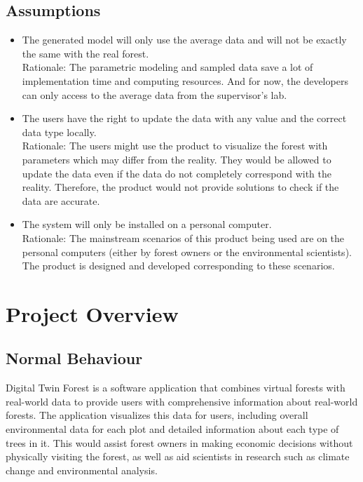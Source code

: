 \documentclass[12pt, titlepage]{article}
\begin{document}
\subsection{Assumptions}
\begin{itemize}
    \item The generated model will only use the average data and will not be exactly the same with the real forest.\\
    Rationale: The parametric modeling and sampled data save a lot of implementation time and computing resources. And for now, the developers can only access to the average data from the supervisor's lab. 
    \item The users have the right to update the data with any value and the correct data type locally. \\
    Rationale: The users might use the product to visualize the forest with parameters which may differ from the reality. They would be allowed to update the data even if the data do not completely correspond with the reality. Therefore, the product would not provide solutions to check if the data are accurate.\\
    \item The system will only be installed on a personal computer.\\
    Rationale: The mainstream scenarios of this product being used are on the personal computers (either by forest owners or the environmental scientists). The product is designed and developed corresponding to these scenarios. 
    
\end{itemize}

\section{Project Overview}

\subsection{Normal Behaviour}
Digital Twin Forest is a software application that combines virtual forests with real-world data to provide users with comprehensive information about real-world forests. The application visualizes this data for users, including overall environmental data for each plot and detailed information about each type of trees in it. This would assist forest owners in making economic decisions without physically visiting the forest, as well as aid scientists in research such as climate change and environmental analysis. \\
\end{document}
